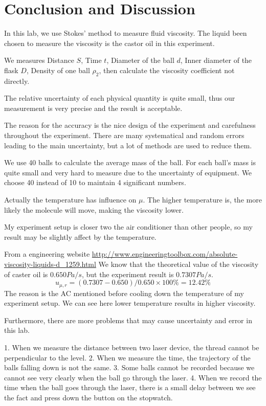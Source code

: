 \section{Conclusion and Discussion}

In this lab, we use Stokes’ method to measure fluid viscosity.
The liquid been chosen to measure the viscosity is  the castor oil in this
experiment.

We measures Distance $S$, Time $t$, Diameter of the ball $d$, Inner diameter of
the flask $D$, Density of one ball $\rho_2$, then calculate the viscosity
coefficient not directly.

The relative uncertainty of each physical quantity is quite small, thus our
measurement is very precise and the result is acceptable.

The reason for the accuracy is the nice design of the experiment and carefulness
throughout the experiment.
There are many systematical and random errors leading to the main uncertainty,
but a lot of methods are used to reduce them.

We use 40 balls to calculate the average mass of the ball.
For each ball's mass is quite small and very hard to measure due to the
uncertainty of equipment. We choose 40 instead of 10 to maintain 4 significant
numbers.

Actually the temperature has influence on $\mu$.
The higher temperature is, the more likely the molecule will move, making the
viscosity lower. 

My experiment setup is closer two the air conditioner than other people, so my
result may be slightly affect by the temperature. 

From a engineering website
\url{http://www.engineeringtoolbox.com/absolute-viscosity-liquids-d_1259.html} 
We know that the theoretical value of the viscosity of caster oil is  $0.650
Pa/s$, but the experiment result is $0.7307Pa/s$.
$$ u_{\mu,r} = (0.7307 - 0.650)/ 0.650 \times 100\%  =  12.42 \%   $$ 
The reason is the AC mentioned before cooling down the temperature of my
experiment setup.
We can see here lower temperature results in higher viscosity.



Furthermore, there are more problems that may cause uncertainty and error in this lab.
\begin{enumerate}
1. When we measure the distance between two laser device, the thread cannot be perpendicular to the level.
2. When we measure the time, the trajectory of the balls falling down is not the same.
3. Some balls cannot be recorded because we cannot see very clearly when the ball go through the laser.
4. When we record the time when the ball goes through the laser, there is a
small delay between we see the fact and press down the button on the stopwatch. 
\end{enumerate}


